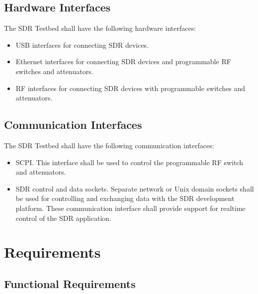 \documentclass[english,titlepage,a4paper]{report}
\begin{document}
\section{Hardware Interfaces}

The \gls{SDR Testbed} shall have the following hardware interfaces:
\begin{itemize}
\item \acrshort{USB} interfaces for connecting \acrshort{SDR} devices.
\item \gls{Ethernet} interfaces for connecting \acrshort{SDR} devices and programmable \acrshort{RF} switches and attenuators.
\item \acrshort{RF} interfaces for connecting \acrshort{SDR} devices with programmable switches and attenuators.
\end{itemize}

\section{Communication Interfaces}

The \gls{SDR Testbed} shall have the following communication interfaces:
\begin{itemize}
\item \gls{SCPI}.
  This interface shall be used to control the programmable \acrshort{RF} switch and attenuators.
\item \acrshort{SDR} control and data sockets.
  Separate network or Unix domain sockets shall be used for controlling and exchanging data with the \gls{SDR development platform}.
  These communication interface shall provide support for realtime control of the \gls{SDR application}.
\end{itemize}

\chapter{Requirements} \label{chapter_4}
\section{Functional Requirements}
\end{document}
